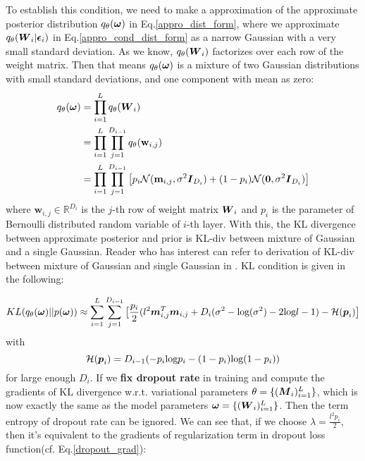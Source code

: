 To establish this condition, we need to make a approximation of the approximate posterior distribution $q_{\theta}(\boldsymbol \omega)$ in Eq.\ref{appro_dist_form}, where we approximate $q_{\theta}(\boldsymbol W_{i}|\boldsymbol \epsilon_{i})$ in Eq.\ref{appro_cond_dist_form} as a narrow Gaussian with a very small standard deviation. As we know, $q_{\theta}(\boldsymbol W_{i})$ factorizes over each row of the weight matrix. Then that means $q_{\theta}(\boldsymbol \omega)$ is a mixture of two Gaussian distributions with small standard deviations, and one component with mean as zero:
\begin{equation}\label{appro_dist_guassian}
\begin{aligned}
q_{\theta}(\boldsymbol \omega) &= \prod_{i=1}^{L}q_{\theta}(\boldsymbol W_{i}) \\
&=\prod_{i=1}^{L}\prod_{j=1}^{D_{i-1}}q_{\theta}(\textbf{w}_{i,j}) \\
&= \prod_{i=1}^{L}\prod_{j=1}^{D_{i-1}} \big[ p_{i} \mathcal N(\textbf{m}_{i,j},\sigma^{2} \boldsymbol I_{D_{i}}) + (1-p_{i})\mathcal N(\boldsymbol 0, \sigma^{2} \boldsymbol I_{D_{i}})\big]
\end{aligned}
\end{equation}
where $\textbf{w}_{i,j} \in \mathbb R^{D_{i}}$ is the $j$-th row of weight matrix $\boldsymbol W_{i}$ and $p_{i}$ is the parameter of Bernoulli distributed random variable of $i$-th layer. With this, the KL divergence between approximate posterior and prior is \gls{KL-div} between mixture of Gaussian and a single Gaussian. 
Reader who has interest can refer to derivation of \gls{KL-div} between mixture of Gaussian and single Gaussian in \cite{gal2016uncertainty}. KL condition is given in the following:

\begin{equation}
\begin{aligned} \label{kl_condition}
KL(q_{\theta}(\boldsymbol \omega) || p(\boldsymbol \omega)) \approx \sum_{i=1}^{L} \sum_{j=1}^{D_{i-1}}
\big[
\frac{p_{i}}{2}(l^{2}\boldsymbol m_{i,j}^{T} \boldsymbol m_{i,j} + D_{i}( \sigma^{2} -\text{log}(\sigma^{2}) -2\text{log} l- 1) - \mathcal H (\boldsymbol p_{i}) 
\big] 
\end{aligned} 
\end{equation}
with 
\[
\mathcal H(\boldsymbol p_{i}) = D_{i-1}(-p_{i}\text{log}p_{i} - (1-p_{i})\text{log}(1-p_{i}))
\]
for large enough $D_{i}$. If we \textbf{fix dropout rate} in training and compute the gradients of KL divergence w.r.t. variational parameters $\theta = \{(\boldsymbol M_{i})_{i=1}^{L} \}$, which is now exactly the same as the model parameters $\boldsymbol \omega = \{(\boldsymbol W_i)_{i=1}^L\}$. Then the term entropy of dropout rate can be ignored.  We can see that, if we choose $\lambda = \frac{l^{2}p_{i}}{2}$, then it's equivalent to the gradients of regularization term in dropout loss function(cf. Eq.\ref{dropout_grad}):

